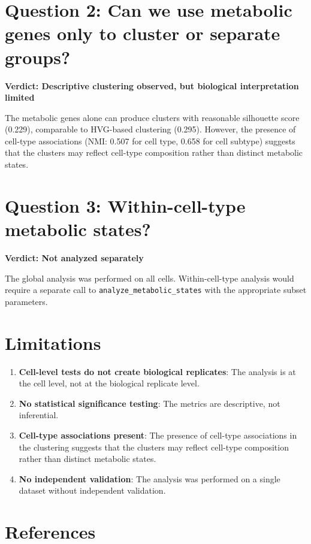 \documentclass[11pt, a4paper]{article}
\begin{document}
\section{Question 2: Can we use metabolic genes only to cluster or separate groups?}

\textbf{Verdict: Descriptive clustering observed, but biological interpretation limited}

The metabolic genes alone can produce clusters with reasonable silhouette score (0.229), comparable to HVG-based clustering (0.295). However, the presence of cell-type associations (NMI: 0.507 for cell type, 0.658 for cell subtype) suggests that the clusters may reflect cell-type composition rather than distinct metabolic states.

\section{Question 3: Within-cell-type metabolic states?}

\textbf{Verdict: Not analyzed separately}

The global analysis was performed on all cells. Within-cell-type analysis would require a separate call to \texttt{analyze\_metabolic\_states} with the appropriate subset parameters.

\section{Limitations}

\begin{enumerate}
    \item \textbf{Cell-level tests do not create biological replicates}: The analysis is at the cell level, not at the biological replicate level.
    \item \textbf{No statistical significance testing}: The metrics are descriptive, not inferential.
    \item \textbf{Cell-type associations present}: The presence of cell-type associations in the clustering suggests that the clusters may reflect cell-type composition rather than distinct metabolic states.
    \item \textbf{No independent validation}: The analysis was performed on a single dataset without independent validation.
\end{enumerate}

\section{References}
\end{document}
